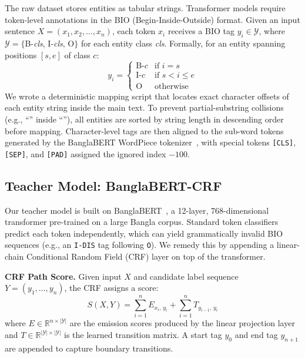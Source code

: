 \documentclass[conference]{IEEEtran}
\begin{document}
The raw dataset stores entities as tabular strings. Transformer models require token-level annotations in the BIO (Begin-Inside-Outside) format. Given an input sentence $X = (x_1, x_2, \ldots, x_n)$, each token $x_i$ receives a BIO tag $y_i \in \mathcal{Y}$, where $\mathcal{Y} = \{$B-\textit{cls}, I-\textit{cls}, O$\}$ for each entity class \textit{cls}. Formally, for an entity spanning positions $[s, e]$ of class $c$:
%
\begin{equation}
  y_i =
  \begin{cases}
    \text{B-}c & \text{if } i = s \\
    \text{I-}c & \text{if } s < i \leq e \\
    \text{O}   & \text{otherwise}
  \end{cases}
  \label{eq:bio}
\end{equation}
%
We wrote a deterministic mapping script that locates exact character offsets of each entity string inside the main text. To prevent partial-substring collisions (e.g., ``'' inside ``''), all entities are sorted by string length in descending order before mapping. Character-level tags are then aligned to the sub-word tokens generated by the BanglaBERT WordPiece tokenizer~\cite{b19}, with special tokens \texttt{[CLS]}, \texttt{[SEP]}, and \texttt{[PAD]} assigned the ignored index $-100$.

\subsection{Teacher Model: BanglaBERT-CRF}

Our teacher model is built on BanglaBERT~\cite{b19}, a 12-layer, 768-dimensional transformer pre-trained on a large Bangla corpus. Standard token classifiers predict each token independently, which can yield grammatically invalid BIO sequences (e.g., an \texttt{I-DIS} tag following \texttt{O}). We remedy this by appending a linear-chain Conditional Random Field (CRF) layer on top of the transformer.

\textbf{CRF Path Score.} Given input $X$ and candidate label sequence $Y = (y_1, \ldots, y_n)$, the CRF assigns a score:
%
\begin{equation}
  S(X, Y) = \sum_{i=1}^{n} E_{x_i,\, y_i} + \sum_{i=1}^{n} T_{y_{i-1},\, y_i}
  \label{eq:crf-score}
\end{equation}
%
where $E \in \mathbb{R}^{n \times |\mathcal{Y}|}$ are the emission scores produced by the linear projection layer and $T \in \mathbb{R}^{|\mathcal{Y}| \times |\mathcal{Y}|}$ is the learned transition matrix. A start tag $y_0$ and end tag $y_{n+1}$ are appended to capture boundary transitions.
\end{document}
